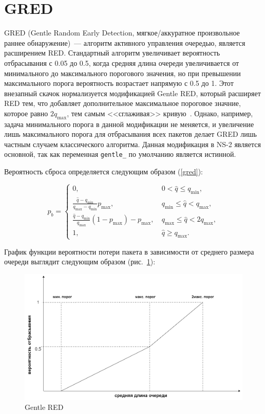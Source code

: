 \section{GRED} 

GRED (Gentle Random Early Detection, мягкое/аккуратное произвольное
раннее обнаружение)~--- алгоритм активного управления очередью,
является расширением RED. Стандартный алгоритм увеличивает
вероятность отбрасывания с 0.05 до 0.5, когда средняя длина очереди
увеличивается от минимального до максимального порогового значения, но
при превышении максимального порога вероятность возрастает напрямую с
0.5 до 1.  Этот внезапный скачок нормализуется модификацией Gentle
RED, который расширяет RED тем, что добавляет дополнительное
максимальное пороговое значние, которое равно $2q_{\max}$, тем самым
<<сглаживая>> кривую~\citep{GRED}. Однако, например, задача минимального порога в данной модификации не меняется, 
и увеличение лишь максимального порога для отбрасывания всех пакетов делает GRED лишь частным случаем классического алгоритма. 
Данная модификация в NS-2 является основной, так как переменная \verb|gentle_| по умолчанию 
является истинной. 

Вероятность сброса определяется следующим образом (\ref{gred}):

\begin{equation}
\label{gred}
p_{b} =\begin{cases}
        0, &  \  0 < \hat{q} \leqslant q_{\min}, 
        \\
        \frac{\hat{q} - q_{\min}}{q_{\max} - q_{\min}} p_{\max}, & \ q_{\min} \leqslant \hat{q} < q_{\max}, 
        \\
        \frac{\hat{q} - q_{\min}}{q_{\max}}(1-p_{\max}) - p_{\max}, & \ q_{\max} \leqslant \hat{q} < 2q_{\max}, 
        \\
        1, &  \ \hat{q} \geqslant  q_{\max}.
\end{cases}
\end{equation}

График функции вероятности потери пакета в зависимости от среднего
размера очереди выглядит следующим образом (рис.~\ref{fig:2.2}):

\begin{figure}[!h]
  \centering
  \includegraphics[width=0.7\linewidth]{image/gred.png}
  \caption{Gentle RED}
  \label{fig:2.2}
\end{figure}


